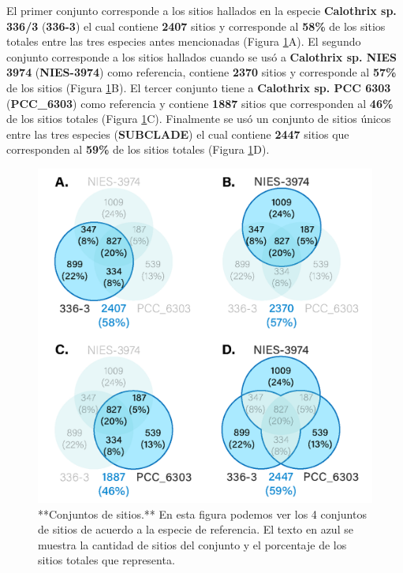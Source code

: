 \documentclass[
]{book}
\begin{document}
El primer conjunto corresponde a los sitios hallados en la especie \textbf{Calothrix sp. 336/3} (\textbf{336-3}) el cual contiene \textbf{2407} sitios y corresponde al \textbf{58\%} de los sitios totales entre las tres especies antes mencionadas (Figura \ref{fig:FIG3x}A). El segundo conjunto corresponde a los sitios hallados cuando se usó a \textbf{Calothrix sp. NIES 3974} (\textbf{NIES-3974}) como referencia, contiene \textbf{2370} sitios y corresponde al \textbf{57\%} de los sitios (Figura \ref{fig:FIG3x}B). El tercer conjunto tiene a \textbf{Calothrix sp. PCC 6303} (\textbf{PCC\_6303}) como referencia y contiene \textbf{1887} sitios que corresponden al \textbf{46\%} de los sitios totales (Figura \ref{fig:FIG3x}C). Finalmente se usó un conjunto de sitios únicos entre las tres especies (\textbf{SUBCLADE}) el cual contiene \textbf{2447} sitios que corresponden al \textbf{59\%} de los sitios totales (Figura \ref{fig:FIG3x}D).

\begin{figure}

{\centering \includegraphics[width=1\linewidth]{Clados/Calothrix_B/figures/All_venn_calothrix} 

}

\caption{**Conjuntos de sitios.** En esta figura podemos ver los 4 conjuntos de sitios de acuerdo a la especie de referencia. El texto en azul se muestra la cantidad de sitios del conjunto y el porcentaje de los sitios totales que representa.}\label{fig:FIG3x}
\end{figure}
\end{document}
